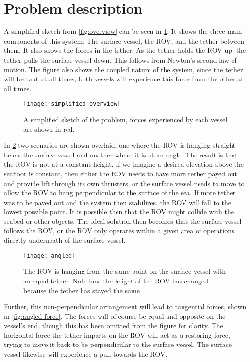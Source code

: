 \section{Problem description}
A simplified sketch from \cref{fig:overview} can be seen in \cref{fig:simple}. It shows the three main components of this system: The surface vessel, the ROV, and the tether between them. It also shows the forces in the tether. As the tether holds the ROV up, the tether pulls the surface vessel down. This follows from Newton's second law of motion. The figure also shows the coupled nature of the system, since the tether will be taut at all times, both vessels will experience this force from the other at all times.

\begin{figure}
	\centering
	\texttt{[image: simplified-overview]}
	\caption{A simplified sketch of the problem, forces experienced by each vessel are shown in red.}
	\label{fig:simple}
\end{figure}

In \cref{fig:angled} two scenarios are shown overlaid, one where the ROV is hanging straight below the surface vessel and another where it is at an angle. The result is that the ROV is not at a constant height. If we imagine a desired elevation above the seafloor is constant, then either the ROV needs to have more tether payed out and provide lift through its own thrusters, or the surface vessel needs to move to allow the ROV to hang perpendicular to the surface of the sea. If more tether was to be payed out and the system then stabilizes, the ROV will fall to the lowest possible point. It is possible then that the ROV might collide with the seabed or other objects. The ideal solution then becomes that the surface vessel follows the ROV, or the ROV only operates within a given area of operations directly underneath of the surface vessel. 

\begin{figure}
	\centering
	\texttt{[image: angled]}
	\caption{The ROV is hanging from the same point on the surface vessel with an equal tether. Note how the height of the ROV has changed because the tether has stayed the same}
	\label{fig:angled}
\end{figure}

Further, this non-perpendicular arrangement will lead to tangential forces, shown in \cref{fig:angled-force}. The forces will of course be equal and opposite on the vessel's end, though this has been omitted from the figure for clarity. The horizontal force the tether imparts on the ROV will act as a restoring force, trying to move it back to be perpendicular to the surface vessel. The surface vessel likewise will experience a pull towards the ROV. 


